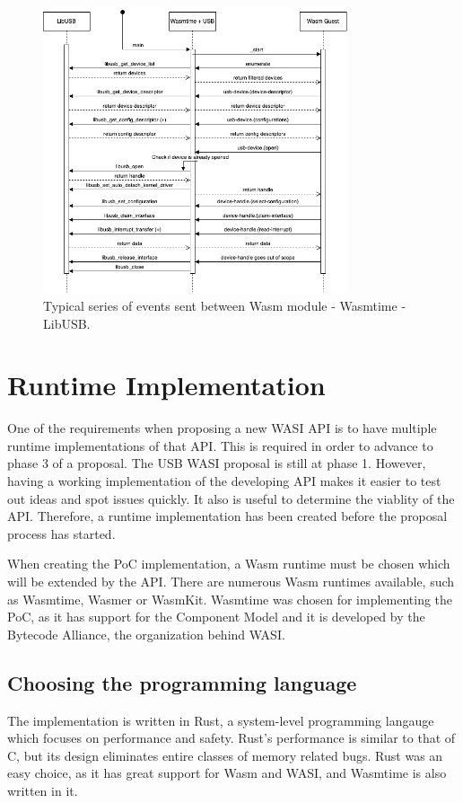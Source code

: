 \begin{figure}[h]
  \centering
  \includegraphics[width=0.8\textwidth]{images/sequentiediagram.png}
  \caption{Typical series of events sent between Wasm module - Wasmtime - LibUSB.}
  \label{fig:implementation_overview}
\end{figure}


\section{Runtime Implementation}
One of the requirements when proposing a new \acrshort{WASI} \acrshort{API} is to have multiple runtime implementations of that \acrshort{API}. This is required in order to advance to phase 3 of a proposal. The \acrshort{USB} \acrshort{WASI} proposal is still at phase 1. However, having a working implementation of the developing \acrshort{API} makes it easier to test out ideas and spot issues quickly. It also is useful to determine the viablity of the \acrshort{API}. Therefore, a runtime implementation has been created before the proposal process has started.

When creating the \acrshort{PoC} implementation, a \acrshort{Wasm} runtime must be chosen which will be extended by the \acrshort{API}. There are numerous \acrshort{Wasm} runtimes available, such as Wasmtime, Wasmer or WasmKit. Wasmtime was chosen for implementing the \acrshort{PoC}, as it has support for the Component Model and it is developed by the Bytecode Alliance, the organization behind \acrshort{WASI}.

\subsection{Choosing the programming language}
The implementation is written in Rust, a system-level programming langauge which focuses on performance and safety. Rust's performance is similar to that of C, but its design eliminates entire classes of memory related bugs. Rust was an easy choice, as it has great support for \acrshort{Wasm} and \acrshort{WASI}, and Wasmtime is also written in it.

